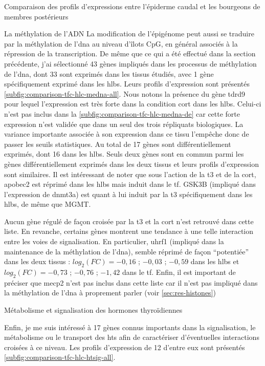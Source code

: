 \documentclass[../main.tex]{subfiles}
\begin{document}
\begin{chapter}{Comparaison des profils d'expressions entre l'épiderme caudal et les bourgeons de membres postérieurs}
\begin{section}{La méthylation de l'ADN}
La modification de l'épigénome peut aussi se traduire par la méthylation de l'\gls{dna} au niveau d'îlots CpG, en général associés à la répression de la transcription.
De même que ce qui a été effectué dans la section précédente, j'ai sélectionné 43 gènes impliqués dans les processus de méthylation de l'\gls{dna}, dont 33 sont exprimés dans les tissus étudiés, avec 1 gène spécifiquement exprimé dans les \glspl{hlb}.
Leurs profils d'expression sont présentés \autoref{subfig:comparison-tfc-hlc-medna-all}.
Nous notons la présence du gène \gls{tdrd9} pour lequel l'expression est très forte dans la condition \gls{cort} dans les \glspl{hlb}.
Celui-ci n'est pas inclus dans la \autoref{subfig:comparison-tfc-hlc-medna-de} car cette forte expression n'est validée que dans un seul des trois répliquats biologiques.
La variance importante associée à son expression dans ce tissu l'empêche donc de passer les seuils statistiques.
Au total de 17 gènes sont différentiellement exprimés, dont 16 dans les \glspl{hlb}.
Seuls deux gènes sont en commun parmi les gènes différentiellement exprimés dans les deux tissus et leurs profils d'expression sont similaires.
Il est intéressant de noter que sous l'action de la \gls{t3} et de la \gls{cort}, \gls{apobec2} est réprimé dans les \glspl{hlb} mais induit dans le \gls{tf}.
GSK3B (impliqué dans l'expression de \gls{dnmt3a}) est quant à lui induit par la \gls{t3} spécifiquement dans les \glspl{hlb}, de même que MGMT.
\par
Aucun gène régulé de façon croisée par la \gls{t3} et la \gls{cort} n'est retrouvé dans cette liste.
En revanche, certains gènes montrent une tendance à une telle interaction entre les voies de signalisation.
En particulier, \gls{uhrf1} (impliqué dans la maintenance de la méthylation de l'\gls{dna}), semble réprimé de façon ``potentiée'' dans les deux tissus :
$log_2(FC)=-0,16$ ; $-0,03$ ; $-0,59$ dans les \glspl{hlb} et $log_2(FC)=-0,73$ ; $-0,76$ ; $-1,42$ dans le \gls{tf}.
Enfin, il est important de préciser que \gls{mecp2} n'est pas inclus dans cette liste car il n'est pas impliqué dans la méthylation de l'\gls{dna} à proprement parler (voir \autoref{sec:res-histones})



\end{section}


\begin{section}{Métabolisme et signalisation des hormones thyroïdiennes}

Enfin, je me suis intéressé à 17 gènes connus importants dans la signalisation, le métabolisme ou le transport des \glspl{ht} afin de caractériser d'éventuelles interactions croisées à ce niveau.
Les profils d'expression de 12 d'entre eux sont présentés \autoref{subfig:comparison-tfc-hlc-htsig-all}.


\end{section}
\end{chapter}
\end{document}
